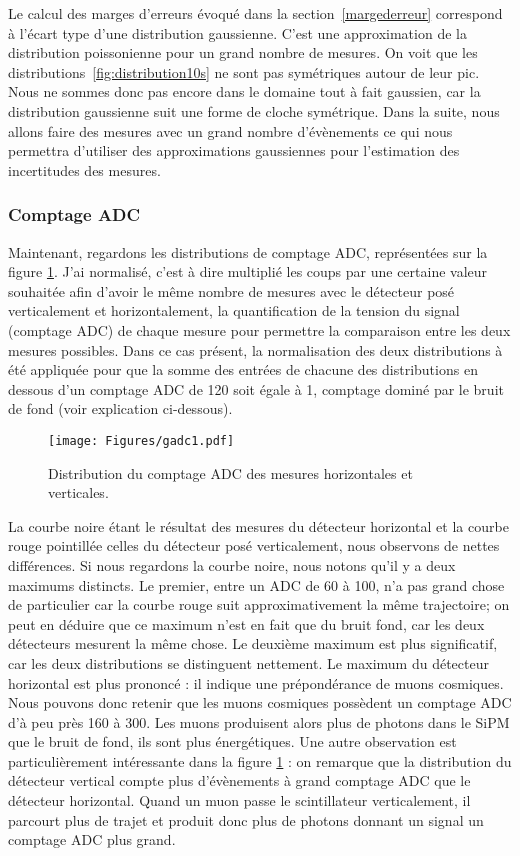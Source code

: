 \documentclass[a4paper, 12pt]{article}
\begin{document}
\begin{spacing}{1.5}
Le calcul des marges d'erreurs évoqué dans la section~\ref{margederreur} correspond à l'écart type d'une distribution gaussienne. C'est une approximation de la distribution poissonienne pour un grand nombre de mesures. On voit que les distributions~\ref{fig:distribution10s} ne sont pas symétriques autour de leur pic. Nous ne sommes donc pas encore dans le domaine tout à fait gaussien, car la distribution gaussienne suit une forme de cloche symétrique. Dans la suite, nous allons faire des mesures avec un grand nombre d'évènements ce qui nous permettra d'utiliser des approximations gaussiennes pour l'estimation des incertitudes des mesures. 

\subsubsection{Comptage ADC}
\label{sec:ADC}

Maintenant, regardons les distributions de comptage ADC, représentées sur la figure \ref{fig:gADC1}. J'ai normalisé, c'est à dire multiplié les coups par une certaine valeur souhaitée afin d'avoir le même nombre de mesures avec le détecteur posé verticalement et horizontalement, la quantification de la tension du signal (comptage ADC) de chaque mesure pour permettre la comparaison entre les deux mesures possibles. Dans ce cas présent, la normalisation des deux distributions à été appliquée pour que la somme des entrées de chacune des distributions en dessous d'un comptage ADC de 120 soit égale à 1, comptage dominé par le bruit de fond (voir explication ci-dessous).
\begin{figure}[t]
\begin{center}
  \texttt{[image: Figures/gadc1.pdf]}
  \caption{\label{fig:gADC1} Distribution du comptage ADC des mesures horizontales et verticales.}
\end{center}
\end{figure}

La courbe noire étant le résultat des mesures du détecteur horizontal et la courbe rouge pointillée celles du détecteur posé verticalement, nous observons de nettes différences. Si nous regardons la courbe noire, nous notons qu'il y a deux maximums distincts. Le premier, entre un ADC de 60 à 100, n'a pas grand chose de particulier car la courbe rouge suit approximativement la même trajectoire; on peut en déduire que ce maximum n'est en fait que du bruit fond, car les deux détecteurs mesurent la même chose. Le deuxième maximum est plus significatif, car les deux distributions se distinguent nettement. Le maximum du détecteur horizontal est plus prononcé : il indique une prépondérance de muons cosmiques. Nous pouvons donc retenir que les muons cosmiques possèdent un comptage ADC d'à peu près 160 à 300. Les muons produisent alors plus de photons dans le SiPM que le bruit de fond, ils sont plus énergétiques. Une autre observation est particulièrement intéressante dans la figure \ref{fig:gADC1} : on remarque que la distribution du détecteur vertical compte plus d'évènements à grand comptage ADC que le détecteur horizontal. Quand un muon passe le scintillateur verticalement, il parcourt plus de trajet et produit donc plus de photons donnant un signal un comptage ADC plus grand.


\end{spacing}
\end{document}
